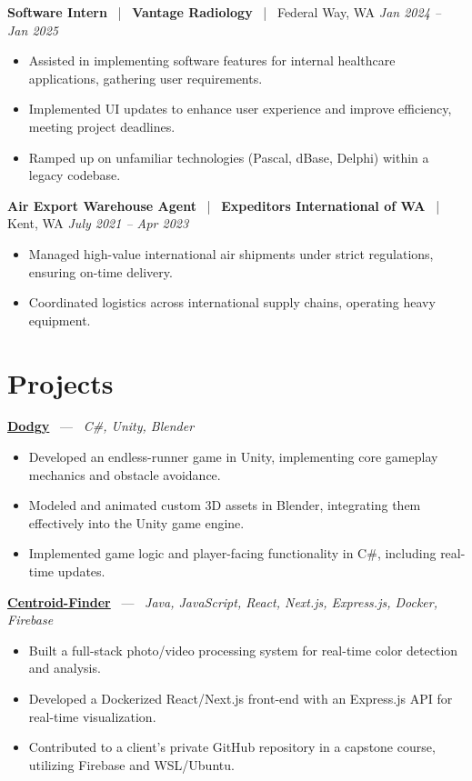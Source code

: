 \documentclass[10pt, letterpaper]{article}
\newcommand{\jobhead}[4]{%
  \vspace{5pt}%
  {\bfseries\color{dark}#1}%
  ~{\color{light}|}~%
  {\bfseries\color{navy}#2}%
  ~{\color{light}|}~%
  {\color{light}#3}%
  \hfill{\color{light}\small\textit{#4}}\\[-2pt]%
}
\newcommand{\projhead}[3]{%
  \vspace{5pt}%
  {\bfseries\color{dark}\href{#2}{#1}}%
  ~{\color{light}---}~%
  {\color{light}\small\textit{#3}}\\[-2pt]%
}
\begin{document}
\jobhead{Software Intern}{Vantage Radiology}{Federal Way, WA}{Jan 2024 – Jan 2025}
\begin{itemize}
  \item Assisted in implementing software features for internal healthcare applications, gathering user requirements.
  \item Implemented UI updates to enhance user experience and improve efficiency, meeting project deadlines.
  \item Ramped up on unfamiliar technologies (Pascal, dBase, Delphi) within a legacy codebase.
\end{itemize}

\jobhead{Air Export Warehouse Agent}{Expeditors International of WA}{Kent, WA}{July 2021 – Apr 2023}
\begin{itemize}
  \item Managed high-value international air shipments under strict regulations, ensuring on-time delivery.
  \item Coordinated logistics across international supply chains, operating heavy equipment.
\end{itemize}

\section{Projects}

\projhead{Dodgy}{https://timyd.itch.io/dodgy}{C\#, Unity, Blender}
\begin{itemize}
  \item Developed an endless-runner game in Unity, implementing core gameplay mechanics and obstacle avoidance.
  \item Modeled and animated custom 3D assets in Blender, integrating them effectively into the Unity game engine.
  \item Implemented game logic and player-facing functionality in C\#, including real-time updates.
\end{itemize}

\projhead{Centroid-Finder}{https://github.com/xavierb117/centroid-finder}{Java, JavaScript, React, Next.js, Express.js, Docker, Firebase}
\begin{itemize}
  \item Built a full-stack photo/video processing system for real-time color detection and analysis.
  \item Developed a Dockerized React/Next.js front-end with an Express.js API for real-time visualization.
  \item Contributed to a client's private GitHub repository in a capstone course, utilizing Firebase and WSL/Ubuntu.
\end{itemize}
\end{document}
